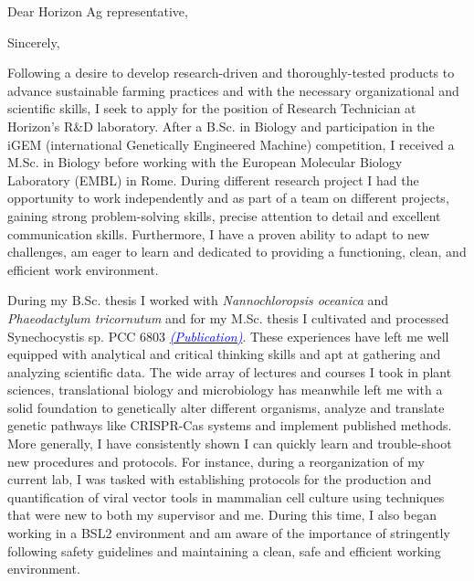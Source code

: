 \documentclass[11pt,a4paper,sans]{moderncv}
\begin{document}
\date{\today}
\opening{Dear Horizon Ag representative,\vspace{-2mm}}
\closing{Sincerely,}
\makelettertitle
\begin{spacing}{1.1}

Following a desire to develop research-driven and thoroughly-tested products to advance sustainable farming practices and with the necessary organizational and scientific skills, I seek to apply for the position of Research Technician at Horizon's R\&D laboratory. After a B.Sc. in Biology and participation in the iGEM (international Genetically Engineered Machine) competition, I received a M.Sc. in Biology before working with the European Molecular Biology Laboratory (EMBL) in Rome. During different research project I had the opportunity to work independently and as part of a team on different projects, gaining strong problem-solving skills, precise attention to detail and excellent communication skills. Furthermore, I have a proven ability to adapt to new challenges, am eager to learn and dedicated to providing a functioning, clean, and efficient work environment.\par%

During my B.Sc. thesis I worked with \textit{Nannochloropsis oceanica} and \textit{Phaeodactylum tricornutum} and for my M.Sc. thesis I cultivated and processed Synechocystis sp. PCC 6803 {\href{https://www.ncbi.nlm.nih.gov/pubmed/29517395}{\textcolor{blue}{{\textit{(Publication)}}}}}. These experiences have left me well equipped with analytical and critical thinking skills and apt at gathering and analyzing scientific data. The wide array of lectures and courses I took in plant sciences, translational biology and microbiology has meanwhile left me with a solid foundation to genetically alter different organisms, analyze and translate genetic pathways like CRISPR-Cas systems and implement published methods. More generally, I have consistently shown I can quickly learn and trouble-shoot new procedures and protocols. For instance, during a reorganization of my current lab, I was tasked with establishing protocols for the production  and quantification of viral vector tools in mammalian cell culture using techniques that were new to both my supervisor and me. During this time, I also began working in a BSL2 environment and am aware of the importance of stringently following safety guidelines and maintaining a clean, safe and efficient working environment.\par%


\end{spacing}
\end{document}
